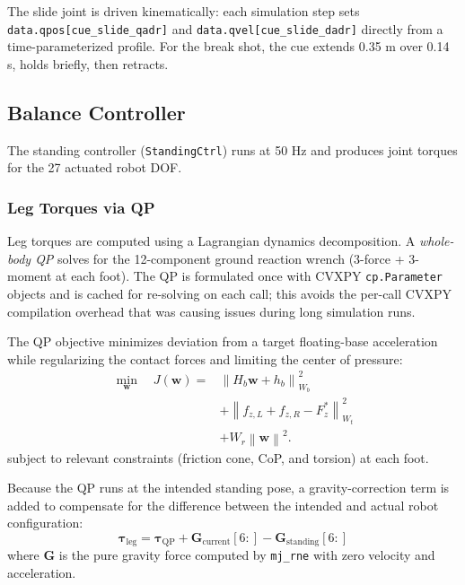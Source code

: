 \documentclass[letterpaper, 12 pt, conference]{ieeeconf}
\begin{document}
The slide joint is driven kinematically: each simulation step sets
\texttt{data.qpos[cue\_slide\_qadr]} and \texttt{data.qvel[cue\_slide\_dadr]}
directly from a time-parameterized profile.
For the break shot, the cue extends 0.35 m over 0.14 s, holds briefly, then
retracts.

\subsection{Balance Controller}

The standing controller (\texttt{StandingCtrl})
runs at 50 Hz and produces joint torques for the 27 actuated robot DOF.

\subsubsection{Leg Torques via QP}

Leg torques are computed using a Lagrangian dynamics decomposition.
A \textit{whole-body QP} solves for the 12-component ground reaction wrench
(3-force + 3-moment at each foot). The QP is formulated once with CVXPY \texttt{cp.Parameter} objects and is cached for re-solving on each call; this avoids the per-call CVXPY compilation overhead that was causing issues during long simulation runs.

The QP objective minimizes deviation from a target floating-base acceleration
while regularizing the contact forces and limiting the center of pressure:
\begin{equation}
\begin{aligned}
\min_{\mathbf{w}} \quad J(\mathbf{w})
= {}&
\left\| H_b\mathbf{w} + h_b \right\|^2_{W_b}
\\
&+
\left\| f_{z,L} + f_{z,R} - F_z^* \right\|^2_{W_t}
\\
&+
W_r\left\|\mathbf{w}\right\|^2 .
\end{aligned}
\end{equation}
subject to relevant constraints (friction cone, CoP, and torsion) at each foot.

Because the QP runs at the intended standing pose, a gravity-correction term
is added to compensate for the difference between the intended and actual robot
configuration:
\begin{equation}
  \boldsymbol{\tau}_\text{leg} = \boldsymbol{\tau}_\text{QP}
    + \mathbf{G}_\text{current}[6:] - \mathbf{G}_\text{standing}[6:]
\end{equation}
where $\mathbf{G}$ is the pure gravity force computed by
\texttt{mj\_rne} with zero velocity and acceleration.
\end{document}
